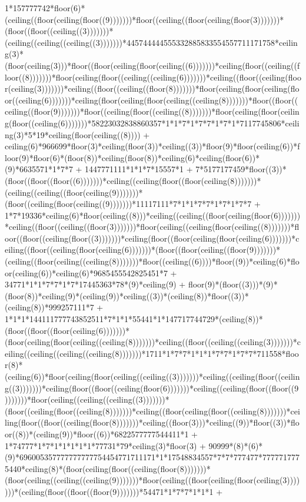 1*157777742*floor(6)*(ceiling((floor(ceiling(floor((9)))))))*floor((ceiling((floor(ceiling(floor(3)))))))*(floor((floor((ceiling((3)))))))*(ceiling((ceiling((ceiling((3)))))))*445744444555332885833554557711171758*ceiling(3)*(floor(ceiling(3)))*floor((floor(ceiling(floor(ceiling((6)))))))*ceiling(floor((ceiling((floor((8)))))))*floor(ceiling(floor((ceiling((ceiling(6)))))))*ceiling((floor((ceiling(floor(ceiling(3)))))))*ceiling((floor((ceiling((floor(8)))))))*floor(ceiling(floor(ceiling(floor((ceiling(6)))))))*ceiling(floor(ceiling(floor(ceiling((ceiling(8)))))))*floor((floor((ceiling((floor(9)))))))*floor((ceiling(floor((ceiling((8)))))))*floor(ceiling(floor(ceiling(floor((ceiling(6)))))))*58223032838860357*1*1*7*1*7*7*1*7*1*7117745806*ceiling(3)*5*19*ceiling(floor(ceiling((8)))) + ceiling(6)*966699*floor(3)*ceiling(floor(3))*ceiling((3))*floor(9)*floor(ceiling(6))*floor(9)*floor(6)*(floor(8))*ceiling(floor(8))*ceiling(6)*ceiling(floor(6))*(9)*6635571*1*7*7 + 1447771111*1*1*7*15557*1 + 7*5177177459*floor((3))*(floor((floor((floor((6)))))))*ceiling((ceiling(floor((floor(ceiling(8)))))))*(ceiling((ceiling((floor(ceiling(9)))))))*(floor((ceiling(floor(ceiling((9)))))))*11117111*7*1*1*7*7*1*7*1*7*7 + 1*7*19336*ceiling(6)*floor(ceiling((8)))*ceiling((ceiling((floor(ceiling(floor(6)))))))*ceiling((floor((ceiling((floor(3)))))))*floor(ceiling((ceiling(floor(ceiling((8)))))))*floor((floor((ceiling(floor((3)))))))*ceiling(floor((floor(ceiling(floor(ceiling(6)))))))*ceiling((floor((ceiling(floor(ceiling(6)))))))*(floor((floor(ceiling((floor(9)))))))*(ceiling((floor(ceiling((ceiling(8)))))))*floor((ceiling((6))))*floor((9))*ceiling(6)*floor(ceiling(6))*ceiling(6)*9685455542825451*7 + 34771*1*1*7*7*1*7*17445363*78*(9)*ceiling(9) + floor(9)*(floor((3)))*(9)*(floor(8))*ceiling(9)*(ceiling(9))*ceiling((3))*(ceiling(8))*floor((3))*(ceiling(8))*999257111*7 + 1*1*1*144111777743852511*7*1*1*55441*1*147717744729*(ceiling(8))*(floor((floor((floor(ceiling(6)))))))*(floor(ceiling(floor(ceiling((ceiling(8)))))))*ceiling((floor((ceiling((ceiling(3)))))))*ceiling((ceiling((ceiling((ceiling(8)))))))*1711*1*7*7*1*1*1*7*7*1*7*7*711558*floor(8)*(ceiling(6))*floor(ceiling(floor(ceiling((ceiling((3)))))))*ceiling((ceiling(floor((ceiling((3)))))))*ceiling(floor((floor((ceiling(floor(6)))))))*ceiling((ceiling(floor((floor((9)))))))*floor(ceiling((ceiling((ceiling((3)))))))*(floor((ceiling(floor((ceiling(8)))))))*ceiling((floor(ceiling(floor((ceiling(8)))))))*ceiling(floor((floor((ceiling(floor(8)))))))*ceiling((floor(3)))*ceiling((9))*floor((3))*floor((8))*(ceiling(9))*floor((6))*6822577777544411*1 + 1*74777*1*7*1*1*1*1*1*77731*79*ceiling(3)*floor(3) + 90999*(8)*(6)*(9)*696005357777777777754454771711171*1*17548834557*7*7*777477*7777717775440*ceiling(8)*(floor(ceiling(floor((ceiling(floor(8)))))))*(floor(ceiling((ceiling((ceiling(9)))))))*floor(ceiling((floor(ceiling(floor(ceiling(3)))))))*(ceiling(floor((floor((floor(9)))))))*54471*1*7*7*1*1*1 + 